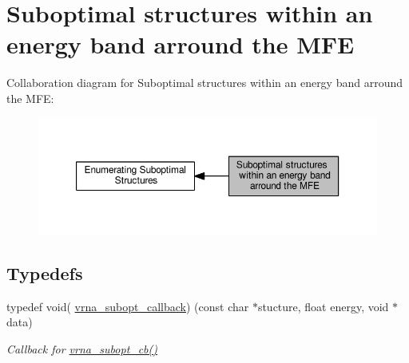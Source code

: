 \hypertarget{group__subopt__wuchty}{}\section{Suboptimal structures within an energy band arround the M\+FE}
\label{group__subopt__wuchty}
Collaboration diagram for Suboptimal structures within an energy band arround the M\+FE\+:
\nopagebreak
\begin{figure}[H]
\begin{center}
\leavevmode
\includegraphics[width=350pt]{group__subopt__wuchty}
\end{center}
\end{figure}
\subsection*{Typedefs}
\begin{DoxyCompactItemize}
\item 
typedef void( \hyperlink{group__subopt__wuchty_ga226e3803a826aba8159284d021c24d01}{vrna\+\_\+subopt\+\_\+callback}) (const char $\ast$stucture, float energy, void $\ast$data)\hypertarget{group__subopt__wuchty_ga226e3803a826aba8159284d021c24d01}{}\label{group__subopt__wuchty_ga226e3803a826aba8159284d021c24d01}

\begin{DoxyCompactList}\small\item\em Callback for \hyperlink{group__subopt__wuchty_ga1053837e6b6f158093508f8a70998352}{vrna\+\_\+subopt\+\_\+cb()} \end{DoxyCompactList}\end{DoxyCompactItemize}
